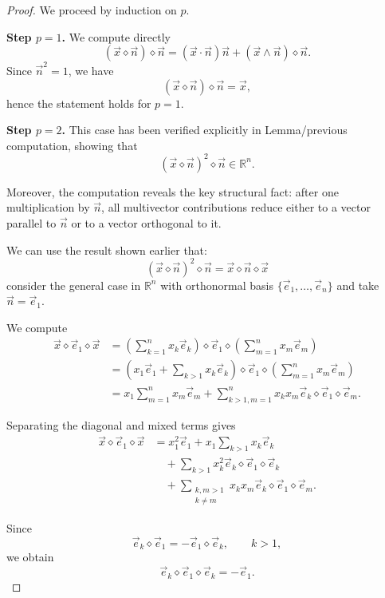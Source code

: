 \documentclass{amsart}
\theoremstyle{plain}
\numberwithin{equation}{section}
\begin{document}
\begin{proof}
We proceed by induction on $p$.

\textbf{Step $p=1$.}
We compute directly
\[
(\vec x \diamond \vec n)\diamond \vec n
=
(\vec x \cdot \vec n)\vec n
+
(\vec x \wedge \vec n)\diamond \vec n.
\]
Since $\vec n^2 = 1$, we have
\[
(\vec x \diamond \vec n)\diamond \vec n = \vec x,
\]
hence the statement holds for $p=1$.

\textbf{Step $p=2$.}
This case has been verified explicitly in Lemma/previous computation,
showing that
\[
(\vec x \diamond \vec n)^2 \diamond \vec n \in \mathbb{R}^n.
\]

Moreover, the computation reveals the key structural fact:
after one multiplication by $\vec n$, all multivector contributions
reduce either to a vector parallel to $\vec n$ or to a vector orthogonal
to it.

We can use the result shown earlier that:
\[
(\vec x \diamond \vec n)^2 \diamond \vec n=
\vec{x}\diamond \vec n \diamond \vec{x}
\]
consider the general case in $\mathbb{R}^n$ with orthonormal basis 
$\{\vec e_1,\dots,\vec e_n\}$ and take $\vec n=\vec e_1$.

We compute
\begin{align*}
\vec{x}\diamond \vec{e}_{1}\diamond \vec{x}
&=
\left( \sum_{k=1}^{n} x_{k}\vec{e}_{k} \right)
\diamond \vec{e}_{1}
\diamond
\left( \sum_{m=1}^{n} x_{m}\vec{e}_{m} \right) \\[6pt]
&=
\left(
x_{1}\vec{e}_{1}
+
\sum_{k>1} x_{k}\vec{e}_{k}
\right)
\diamond \vec{e}_{1}
\diamond
\left( \sum_{m=1}^{n} x_{m}\vec{e}_{m} \right) \\[6pt]
&=
x_{1}
\sum_{m=1}^{n}
x_{m}\vec{e}_{m}
+
\sum_{k>1,m=1}^{n}
x_{k}x_{m}
\vec{e}_{k}\diamond \vec{e}_{1}\diamond \vec{e}_{m}.
\end{align*}

Separating the diagonal and mixed terms gives
\begin{align*}
\vec{x}\diamond \vec{e}_{1}\diamond \vec{x}
&=
x_{1}^{2}\vec{e}_{1}
+
x_{1}\sum_{k>1}x_{k}\vec{e}_{k} \\[4pt]
&\quad
+
\sum_{k>1}
x_{k}^{2}
\vec{e}_{k}\diamond \vec{e}_{1}\diamond \vec{e}_{k} \\[4pt]
&\quad
+
\sum_{\substack{k,m>1\\k\neq m}}
x_{k}x_{m}
\vec{e}_{k}\diamond \vec{e}_{1}\diamond \vec{e}_{m}.
\end{align*}

Since
\[
\vec e_k\diamond \vec e_1
=
-
\vec e_1\diamond \vec e_k,
\qquad k>1,
\]
we obtain
\[
\vec e_k\diamond \vec e_1\diamond \vec e_k
=
-\vec e_1.
\]


\end{proof}
\end{document}

